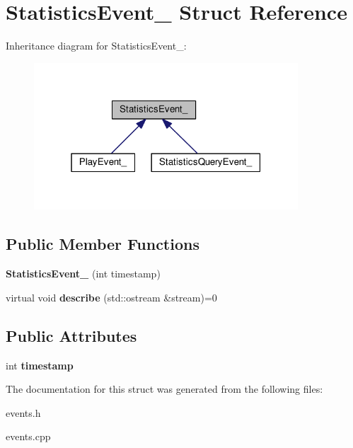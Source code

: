 \hypertarget{struct_statistics_event__}{}\section{Statistics\+Event\+\_\+ Struct Reference}
\label{struct_statistics_event__}


Inheritance diagram for Statistics\+Event\+\_\+\+:
\nopagebreak
\begin{figure}[H]
\begin{center}
\leavevmode
\includegraphics[width=280pt]{struct_statistics_event____inherit__graph}
\end{center}
\end{figure}
\subsection*{Public Member Functions}
\begin{DoxyCompactItemize}
\item 
{\bfseries Statistics\+Event\+\_\+} (int timestamp)\hypertarget{struct_statistics_event___ad2129dfed5eec03929d58755df7e9ec6}{}\label{struct_statistics_event___ad2129dfed5eec03929d58755df7e9ec6}

\item 
virtual void {\bfseries describe} (std\+::ostream \&stream)=0\hypertarget{struct_statistics_event___a2db4e4f8deeaddcea32bac29b38c5866}{}\label{struct_statistics_event___a2db4e4f8deeaddcea32bac29b38c5866}

\end{DoxyCompactItemize}
\subsection*{Public Attributes}
\begin{DoxyCompactItemize}
\item 
int {\bfseries timestamp}\hypertarget{struct_statistics_event___afb83303a81af3c73cbd418a2a5eb5119}{}\label{struct_statistics_event___afb83303a81af3c73cbd418a2a5eb5119}

\end{DoxyCompactItemize}


The documentation for this struct was generated from the following files\+:\begin{DoxyCompactItemize}
\item 
events.\+h\item 
events.\+cpp\end{DoxyCompactItemize}
